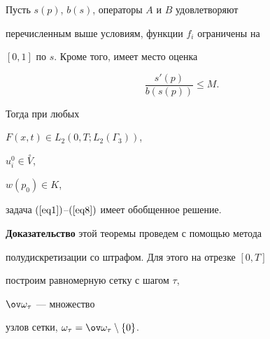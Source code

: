\begin{thm}


\label{t1}


Пусть $s(p)$, $b(s)$, операторы $A$ и $B$ удовлетворяют


перечисленным выше условиям, функции $f_{i}$ ограничены на


$[0,1]$ по $s$. Кроме того, имеет место оценка


\begin{equation}


\frac{s'(p)}{b(s(p))} \leq M.


\label{eq13}


\end{equation}


Тогда при любых


$F(x,t) \in L_{2}(0,T;L_{2}(\Gamma_{3}))$,


$u_{i}^{0} \in \overset{\circ}{V}$,


$w(p_{0}) \in K$,


задача $(\ref{eq1})$--$(\ref{eq8})$ имеет обобщенное решение.


\end{thm}





{\bf Доказательство} этой теоремы проведем с помощью метода


полудискретизации со штрафом. Для этого на отрезке $[0,T]$


построим равномерную сетку с шагом $ \tau$,


$\ov \omega_{\tau}$ --- множество


узлов сетки, $\omega_{\tau} = \ov \omega_{\tau} \setminus \{0 \}$.





